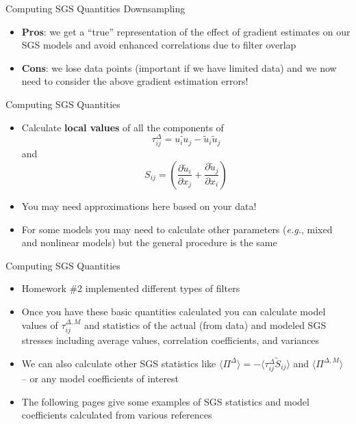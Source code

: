 \begin{frame}{Computing SGS Quantities}
Downsampling
\begin{itemize}
	\item \textbf{Pros}: we get a ``true'' representation of the effect of gradient estimates on our SGS models and avoid enhanced correlations due to filter overlap
	\item \textbf{Cons}: we lose data points (important if we have limited data) and we now need to consider the above gradient estimation errors!
\end{itemize}
\end{frame}
\begin{frame}{Computing SGS Quantities}
\begin{itemize}
	\item  Calculate \textbf{local values} of all the components of 
	$$\tau_{ij}^{\Delta} = \widetilde{u_iu_j} - \widetilde{u}_i\widetilde{u}_j$$
	and
	$$S_{ij} = \left( \frac{\partial \widetilde{u}_i}{\partial x_j} + \frac{\partial \widetilde{u}_j}{\partial x_i}\right)$$
	\item You may need approximations here based on your data!
	\item  For some models you may need to calculate other parameters (\textit{e.g.}, mixed and nonlinear models) but the general procedure is the same
\end{itemize}
\end{frame}
\begin{frame}{Computing SGS Quantities}
\begin{itemize}
	\item Homework \#2 implemented different types of filters
	\item Once you have these basic quantities calculated you can calculate model values of $\tau_{ij}^{\Delta,M}$ and statistics of the actual (from data) and modeled SGS stresses including average values, correlation coefficients, and variances
	\item We can also calculate other SGS statistics like $\langle \Pi^{\Delta}\rangle = - \langle\tau_{ij}^{\Delta}\widetilde{S}_{ij}\rangle$ and $\langle \Pi^{\Delta,M}\rangle$ -- or any model coefficients of interest
	\item The following pages give some examples of SGS statistics and model coefficients calculated from various references
\end{itemize}
\end{frame}
